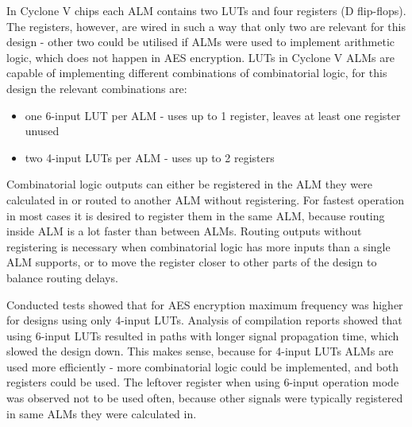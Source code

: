 In Cyclone V chips each ALM contains two LUTs and four registers (D flip-flops). The registers, however, are wired in such a way that only two are relevant for this design - other two could be utilised if ALMs were used to implement arithmetic logic, which does not happen in AES encryption. LUTs in Cyclone V ALMs are capable of implementing different combinations of combinatorial logic, for this design the relevant combinations are:
\begin{itemize}[noitemsep]
\item one 6-input LUT per ALM - uses up to 1 register, leaves at least one register unused
\item two 4-input LUTs per ALM - uses up to 2 registers
\end{itemize}

Combinatorial logic outputs can either be registered in the ALM they were calculated in or routed to another ALM without registering. For fastest operation in most cases it is desired to register them in the same ALM, because routing inside ALM is a lot faster than between ALMs. Routing outputs without registering is necessary when combinatorial logic has more inputs than a single ALM supports, or to move the register closer to other parts of the design to balance routing delays.

Conducted tests showed that for AES encryption maximum frequency was higher for designs using only 4-input LUTs. Analysis of compilation reports showed that using 6-input LUTs resulted in paths with longer signal propagation time, which slowed the design down. This makes sense, because for 4-input LUTs ALMs are used more efficiently - more combinatorial logic could be implemented, and both registers could be used. The leftover register when using 6-input operation mode was observed not to be used often, because other signals were typically registered in same ALMs they were calculated in.

